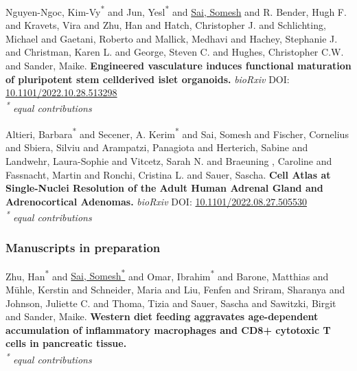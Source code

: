 Nguyen-Ngoc, Kim-Vy\textsuperscript{*} and Jun, Yesl\textsuperscript{*} and \underline{Sai, Somesh} and R. Bender, Hugh F. and Kravets, Vira and Zhu, Han and Hatch, Christopher J. and Schlichting, Michael  and Gaetani, Roberto and Mallick, Medhavi and Hachey, Stephanie J. and Christman, Karen L.  and George, Steven C.  and Hughes, Christopher C.W. and Sander, Maike. \textbf{Engineered vasculature induces functional maturation of pluripotent stem cellderived islet organoids.} \textit{bioRxiv} DOI: \href{10.1101/2022.10.28.513298}{10.1101/2022.10.28.513298}\\\textit{\textsuperscript{*} equal contributions}\\


\clearpage

Altieri, Barbara\textsuperscript{*} and Secener, A. Kerim\textsuperscript{*} and Sai, Somesh and Fischer, Cornelius and Sbiera, Silviu and Arampatzi, Panagiota and Herterich, Sabine and Landwehr, Laura-Sophie and Vitcetz, Sarah N. and Braeuning , Caroline and Fassnacht, Martin and Ronchi, Cristina L. and Sauer, Sascha. \textbf{Cell Atlas at Single-Nuclei Resolution of the Adult Human Adrenal Gland and Adrenocortical Adenomas.} \textit{bioRxiv} DOI: \href{10.1101/2022.08.27.505530}{10.1101/2022.08.27.505530}\\\textit{\textsuperscript{*} equal contributions}\\


\subsubsection{\Large Manuscripts in preparation}

Zhu, Han\textsuperscript{*} and \underline{Sai, Somesh\textsuperscript{*}} and Omar, Ibrahim\textsuperscript{*} and Barone, Matthias and Mühle, Kerstin and Schneider, Maria and Liu, Fenfen and Sriram, Sharanya and Johnson, Juliette C. and Thoma, Tizia and Sauer, Sascha and Sawitzki, Birgit and Sander, Maike. \textbf{Western diet feeding aggravates age-dependent accumulation of inflammatory macrophages and CD8+ cytotoxic T cells in pancreatic tissue.}\\\textit{\textsuperscript{*} equal contributions}\\


